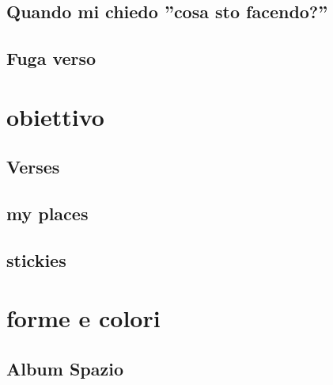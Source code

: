 \documentclass[oneside,21pt,fleqn]{memoir}%
\newcounter{cherrychapter}%
\begin{document}
\chapter{Quando mi chiedo ''cosa sto facendo?''}


\chapter{Fuga verso}


\part{obiettivo}
\listofkeywords
\chapter{Verses}

\chapter{my places}
\PartialToc
\begin{refsection}

\end{refsection}

\chapter{stickies}
\PartialToc
\listofkeywords


\part{forme e colori}

\chapter{Album Spazio}
\PartialToc
\listofkeywords

\end{document}
